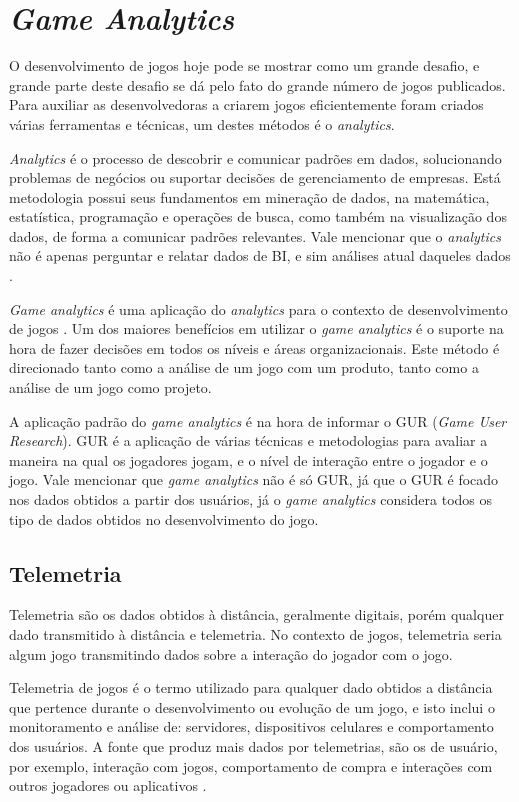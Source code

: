 \section{\textit{Game Analytics}}
O desenvolvimento de jogos hoje pode se mostrar como um grande desafio, e grande parte deste desafio se dá pelo fato do grande número de jogos publicados. Para auxiliar as desenvolvedoras a criarem jogos eficientemente foram criados várias ferramentas e técnicas, um destes métodos é o \textit{analytics}.

\textit{Analytics} é o processo de descobrir e comunicar padrões em dados, solucionando problemas de negócios ou suportar decisões de gerenciamento de empresas. Está metodologia possui seus fundamentos em mineração de dados, na matemática, estatística, programação e operações de busca, como também na visualização dos dados, de forma a comunicar padrões relevantes. Vale mencionar que o \textit{analytics} não é apenas perguntar e relatar dados de BI, e sim análises atual daqueles dados \cite{analytics}. 

\textit{Game analytics} é uma aplicação do \textit{analytics} para o contexto de desenvolvimento de jogos \cite{game_analytics}. Um dos maiores benefícios em utilizar o \textit{game analytics} é o suporte na hora de fazer decisões em todos os níveis e áreas organizacionais. Este método é direcionado tanto como a análise de um jogo com um produto, tanto como a análise de um jogo como projeto.

A aplicação padrão do \textit{game analytics} é na hora de informar o GUR (\textit{Game User Research}). GUR é a aplicação de várias técnicas e metodologias para avaliar a maneira na qual os jogadores jogam, e o nível de interação entre o jogador e o jogo. Vale mencionar que \textit{game analytics} não é só GUR, já que o GUR é focado nos dados obtidos a partir dos usuários, já o \textit{game analytics} considera todos os tipo de dados obtidos no desenvolvimento do jogo.
\subsection{Telemetria}
Telemetria são os dados obtidos à distância, geralmente digitais, porém qualquer dado transmitido à distância e telemetria. No contexto de jogos, telemetria seria algum jogo transmitindo dados sobre a interação do jogador com o jogo.

Telemetria de jogos é o termo utilizado para qualquer dado obtidos a distância que pertence durante o desenvolvimento ou evolução de um jogo, e isto inclui o monitoramento e análise de: servidores, dispositivos celulares e comportamento dos usuários. A fonte que produz mais dados por telemetrias, são os de usuário, por exemplo, interação com jogos, comportamento de compra e interações com outros jogadores ou aplicativos \cite{telemetry}.
